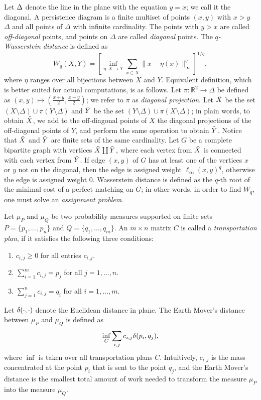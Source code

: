\documentclass{ws-ijcga}
\renewcommand{\geq}{\geqslant}
\newcommand{\RR}{\mathbb{R}}
\newcommand{\wsdist}[1]{{W_{#1}}}
\begin{document}
Let ${\Delta}$ denote the line in the plane with the equation $y = x$; we call it the diagonal.
A persistence diagram is a finite multiset of points $(x, y)$ with $x > y$
$\Delta$ and all points of $\Delta$ with infinite cardinality.
The points with $y > x$ are called \textit{off-diagonal} points,
and points on $\Delta$ are called \textit{diagonal} points.
The \emph{$q$-Wasserstein distance} is defined as
\[
    \wsdist{q}(X,Y) = \left[ \inf_{\eta:X\rightarrow Y} \sum_{x\in X} \|x-\eta(x)\|_\infty^q\right]^{1/q},
\]
where $\eta$ ranges over all bijections between $X$ and $Y$.
Equivalent definition, which is better suited for actual computations,
is as follows. Let $\pi\colon \RR^2 \to \Delta$ be defined
as $(x,y) \mapsto (\frac{x+y}{2}, \frac{x+y}{2})$; we refer to $\pi$ as \textit{diagonal
projection}. Let ${\tilde{X}}$ be the set $(X\setminus \Delta) \cup \pi(Y \setminus \Delta)$
and ${\tilde{Y}}$ be the set $(Y\setminus \Delta) \cup \pi(X \setminus \Delta)$; in plain words,
to obtain ${\tilde{X}}$, we add to the off-diagonal points of $X$
the diagonal projections of the off-diagonal points of $Y$,
and perform the same operation to obtain ${\tilde{Y}}$. Notice that ${\tilde{X}}$ and ${\tilde{Y}}$
are finite sets of the same cardinality. Let $G$ be a complete bipartite
graph with vertices ${\tilde{X}} \coprod {\tilde{Y}}$, where each vertex from ${\tilde{X}}$
is connected with each vertex from ${\tilde{Y}}$. If edge $(x,y)$ of $G$
has at least one of the vertices $x$ or $y$ not on the diagonal,
then the edge is assigned weight $\ell_{\infty}(x, y)^q$, otherwise
the edge is assigned weight 0. Wasserstein distance is defined as the $q$-th
root of the minimal cost of a perfect matching on $G$; in other words,
in order to find $\wsdist{q}$, one must solve an \textit{assignment problem}.


Let $\mu_P$ and $\mu_Q$
be two probability measures supported
on finite sets $P = \{p_1, \dots, p_n \}$
and $Q = \{ q_1, \dots, q_m \}$.
An $m \times n$ matrix $C$
is called a \textit{transportation plan},
if it satisfies the following three conditions:
\begin{enumerate}
    \item $c_{i,j} \geq 0$ for all entries $c_{i, j}$.
    \item $\sum_{i = 1}^m c_{i, j} = p_j$ for all $j = 1, \dots, n$.
    \item $\sum_{j = 1}^n c_{i, j} = q_i$ for all $i = 1, \dots, m$.
\end{enumerate}
Let $\delta(\cdot, \cdot)$ denote the Euclidean
distance in plane.
The Earth Mover's distance between $\mu_P$ and $\mu_Q$
is defined as
\[
    \inf_C \sum_{i, j} c_{i, j} \delta(p_i, q_j),
\]
where $\inf$ is taken over all transportation
plans $C$. Intuitively, $c_{i,j}$ is the
mass concentrated at the point $p_i$ that
is sent to the point $q_j$, and the Earth Mover's
distance is the smallest total amount of work
needed to transform the measure $\mu_P$
into the measure $\mu_Q$.
\end{document}

